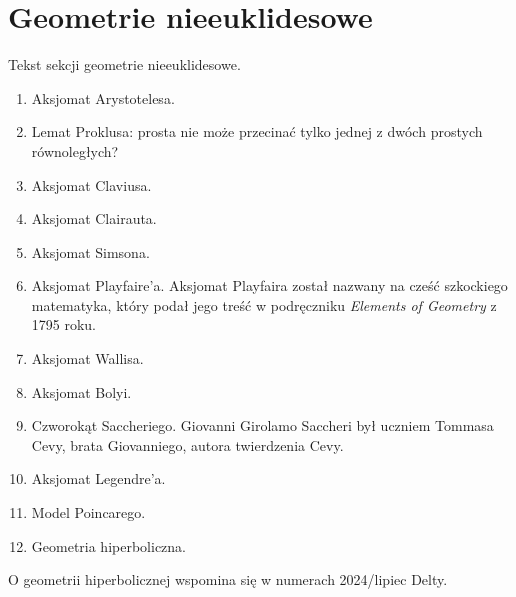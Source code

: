 %

\chapter{Geometrie nieeuklidesowe}
Tekst sekcji geometrie nieeuklidesowe.
\begin{enumerate}
	\item Aksjomat Arystotelesa. 
	\item Lemat Proklusa: prosta nie może przecinać tylko jednej z dwóch prostych równoległych? 
	\item Aksjomat Claviusa. 
	\item Aksjomat Clairauta. 
	\item Aksjomat Simsona. 
	\item Aksjomat Playfaire'a. 
	Aksjomat Playfaira został nazwany na cześć szkockiego matematyka, który podał jego treść w podręczniku \emph{Elements of Geometry} z 1795 roku.
%
	\item Aksjomat Wallisa. 
	\item Aksjomat Bolyi. 
	\item Czworokąt Saccheriego. %
	Giovanni Girolamo Saccheri był uczniem Tommasa Cevy, brata Giovanniego, autora twierdzenia Cevy.
	\item Aksjomat Legendre'a. 
	\item Model Poincarego. 
	\item Geometria hiperboliczna. 
\end{enumerate}

O geometrii hiperbolicznej wspomina się w numerach 2024/lipiec Delty.

%
